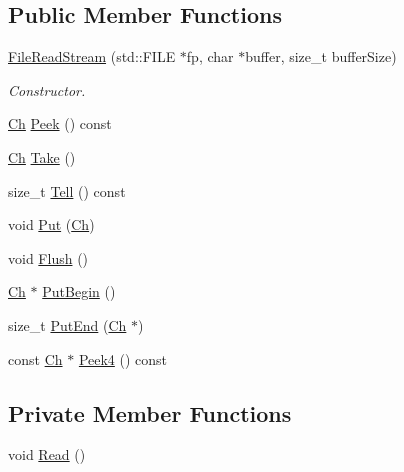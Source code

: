 \subsection*{Public Member Functions}
\begin{DoxyCompactItemize}
\item 
\mbox{\hyperlink{classrapidjson_1_1_file_read_stream_a72b610ada5d86e8977a2bc1f2f4c0808}{File\+Read\+Stream}} (std\+::\+F\+I\+LE $\ast$fp, char $\ast$buffer, size\+\_\+t buffer\+Size)
\begin{DoxyCompactList}\small\item\em Constructor. \end{DoxyCompactList}\item 
\mbox{\hyperlink{classrapidjson_1_1_file_read_stream_a4a5f34875b40d22def206c9a09ecd929}{Ch}} \mbox{\hyperlink{classrapidjson_1_1_file_read_stream_ac1ae71d3abf9de0da0fcd02f4a4a91e1}{Peek}} () const
\item 
\mbox{\hyperlink{classrapidjson_1_1_file_read_stream_a4a5f34875b40d22def206c9a09ecd929}{Ch}} \mbox{\hyperlink{classrapidjson_1_1_file_read_stream_a96ccdf2feca81ad57ccfd489ffeaf84b}{Take}} ()
\item 
size\+\_\+t \mbox{\hyperlink{classrapidjson_1_1_file_read_stream_a100ae611dab44b2533e3a13d409c8234}{Tell}} () const
\item 
void \mbox{\hyperlink{classrapidjson_1_1_file_read_stream_a581c9287a3d0df4db997276be40c1d29}{Put}} (\mbox{\hyperlink{classrapidjson_1_1_file_read_stream_a4a5f34875b40d22def206c9a09ecd929}{Ch}})
\item 
void \mbox{\hyperlink{classrapidjson_1_1_file_read_stream_a1b3ae0fe7ad88d8c9c1fac7854d1d7ec}{Flush}} ()
\item 
\mbox{\hyperlink{classrapidjson_1_1_file_read_stream_a4a5f34875b40d22def206c9a09ecd929}{Ch}} $\ast$ \mbox{\hyperlink{classrapidjson_1_1_file_read_stream_a5230a74fccebd3bc41f5e455e3cf7777}{Put\+Begin}} ()
\item 
size\+\_\+t \mbox{\hyperlink{classrapidjson_1_1_file_read_stream_a3160ea8b9906840ef690a07784b97acf}{Put\+End}} (\mbox{\hyperlink{classrapidjson_1_1_file_read_stream_a4a5f34875b40d22def206c9a09ecd929}{Ch}} $\ast$)
\item 
const \mbox{\hyperlink{classrapidjson_1_1_file_read_stream_a4a5f34875b40d22def206c9a09ecd929}{Ch}} $\ast$ \mbox{\hyperlink{classrapidjson_1_1_file_read_stream_a905873a05053d1415f73c5c05c732b32}{Peek4}} () const
\end{DoxyCompactItemize}
\subsection*{Private Member Functions}
\begin{DoxyCompactItemize}
\item 
void \mbox{\hyperlink{classrapidjson_1_1_file_read_stream_a0384a7f4c9d329feff973e70ad702365}{Read}} ()
\end{DoxyCompactItemize}

